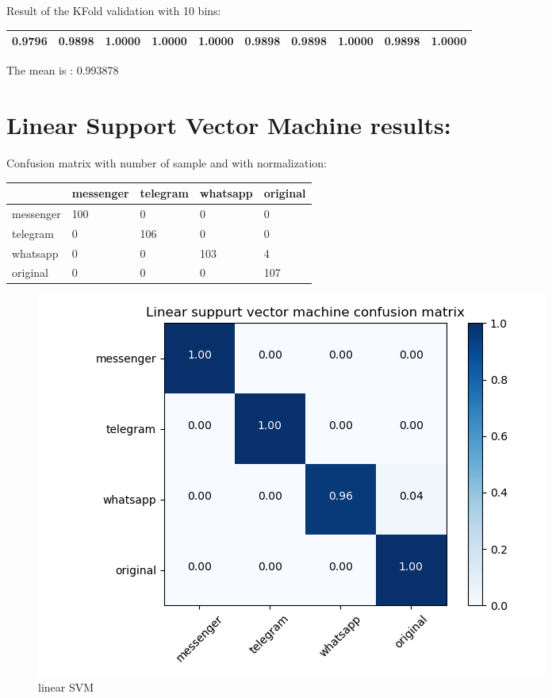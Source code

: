 Result of the KFold validation with 10 bins:
 {\def\arraystretch{1.3} 
 \begin{table}[H] 
\centering 
\begin{tabular}{|l |l |l |l |l |l |l |l |l |l |}  
\hline 
0.9796&
0.9898&
1.0000&
1.0000&
1.0000&
0.9898&
0.9898&
1.0000&
0.9898&
1.0000\\ \hline  

\end{tabular} 
\end{table} }

The mean is : 0.993878



\section{Linear Support Vector Machine results:}Confusion matrix with number of sample and with normalization:
 {\def\arraystretch{1.3} 
 \begin{table}[H] 
\centering 
\begin{tabular}{|l|l|l|l|l|} 
\hline 
  &messenger  &telegram  &whatsapp  &original  \\ \hline
messenger  &100  &0  &0  &0  \\ \hline
telegram  &0  &106  &0  &0  \\ \hline
whatsapp  &0  &0  &103  &4  \\ \hline
original  &0  &0  &0  &107  \\ \hline
\end{tabular} 
\end{table} }

 \begin{figure}[H] 
\centering 
\includegraphics[scale=.6]{images/new_met_lsvm_initial.png} 
\caption{linear SVM} 
\end{figure} 


